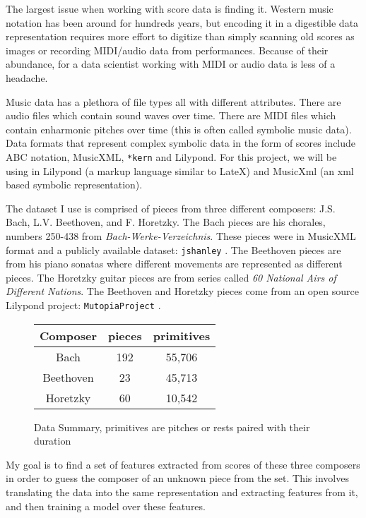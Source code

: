 \documentclass[10pt]{IEEEtran}
\begin{document}
The largest issue when working with score data is finding it. Western music
notation has been around for hundreds years, but encoding it in a digestible
data representation requires more effort to digitize than simply scanning old
scores as images or recording MIDI/audio data from performances. Because of
their abundance, for a data scientist working with MIDI or audio data is less
of a headache.

Music data has a plethora of file types all with different attributes. There are
audio files which contain sound waves over time. There are MIDI files which
contain enharmonic pitches over time (this is often called symbolic music data).
Data formats that represent complex symbolic data in the form of scores include
ABC notation, MusicXML, {\tt **kern} and Lilypond. For this project, we will
be using in Lilypond (a markup language similar to LateX) and MusicXml (an xml
based symbolic representation).

The dataset I use is comprised of pieces from three different composers:
J.S. Bach, L.V. Beethoven, and F. Horetzky. The Bach pieces are his chorales,
numbers 250-438 from {\it Bach-Werke-Verzeichnis}. These pieces were in
MusicXML format and a publicly available dataset: {\tt jshanley}
\cite{jshanley}. The Beethoven pieces are from his piano sonatas where different
movements are represented as different pieces. The Horetzky guitar pieces are
from series called {\it 60 National Airs of Different Nations}. The Beethoven
and Horetzky pieces come from an open source Lilypond project:
{\tt MutopiaProject} \cite{Mutopia}.

\begin{figure}
  \begin{center}
    \begin{tabular}{c | c c}
      Composer & pieces & primitives\\
      \hline
      Bach      & 192 & 55,706 \\
      Beethoven &  23 & 45,713 \\
      Horetzky  &  60 & 10,542 \\
    \end{tabular}
  \end{center}
  \caption{Data Summary, primitives are pitches or rests paired with their
    duration\label{datasummary}}
\end{figure}

My goal is to find a set of features extracted from scores of these three
composers in order to guess the composer of an unknown piece from the set. This
involves translating the data into the same representation and extracting
features from it, and then training a model over these features.
\end{document}
